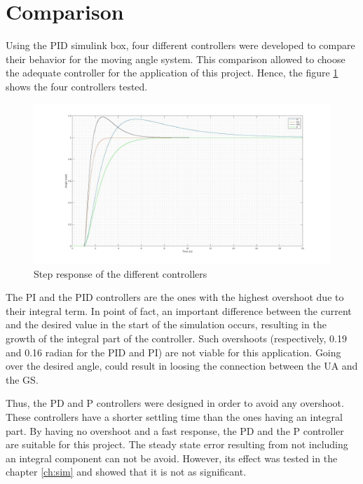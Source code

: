 \section{Comparison}
Using the PID simulink box, four different controllers were developed to compare their behavior for the moving angle system. This comparison allowed to choose the adequate controller for the application of this project. Hence, the figure \ref{fig:comp_pid} shows the four controllers tested.

\begin{figure}[H]
\centering
\includegraphics[scale=0.2]{figures/comp_full.jpg}
\caption{Step response of the different controllers}
\label{fig:comp_pid}
\end{figure}

The PI and the PID controllers are the ones with the highest overshoot due to their integral term. In point of fact, an important difference between the current and the desired value in the start of the simulation occurs, resulting in the growth of the integral part of the controller. 
Such overshoots (respectively, 0.19 and 0.16 radian for the PID and PI) are not viable for this application. Going over the desired angle, could result in loosing the connection between the UA and the GS.

Thus, the PD and P controllers were designed in order to avoid any overshoot. These controllers have a shorter settling time than the ones having an integral part. By having no overshoot and a fast response, the PD and the P controller are suitable for this project. The steady state error resulting from not including an integral component can not be avoid. However, its effect was tested in the chapter \ref{ch:sim} and showed that it is not as significant.

\vspace{5mm}

